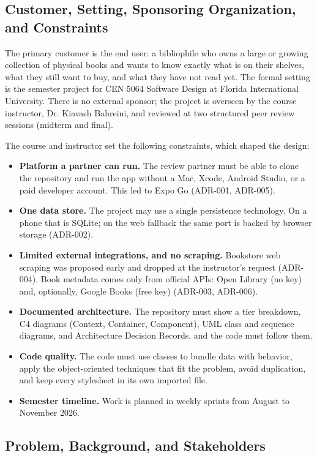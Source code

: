 \documentclass[12pt]{article}
\begin{document}
\subsection{Customer, Setting, Sponsoring Organization, and Constraints}

The primary customer is the end user: a bibliophile who owns a large or growing collection of physical books and wants to know exactly what is on their shelves, what they still want to buy, and what they have not read yet. The formal setting is the semester project for CEN 5064 Software Design at Florida International University. There is no external sponsor; the project is overseen by the course instructor, Dr. Kiavash Bahreini, and reviewed at two structured peer review sessions (midterm and final).

The course and instructor set the following constraints, which shaped the design:
\begin{itemize}
    \item \textbf{Platform a partner can run.} The review partner must be able to clone the repository and run the app without a Mac, Xcode, Android Studio, or a paid developer account. This led to Expo Go (ADR-001, ADR-005).
    \item \textbf{One data store.} The project may use a single persistence technology. On a phone that is SQLite; on the web fallback the same port is backed by browser storage (ADR-002).
    \item \textbf{Limited external integrations, and no scraping.} Bookstore web scraping was proposed early and dropped at the instructor's request (ADR-004). Book metadata comes only from official APIs: Open Library (no key) and, optionally, Google Books (free key) (ADR-003, ADR-006).
    \item \textbf{Documented architecture.} The repository must show a tier breakdown, C4 diagrams (Context, Container, Component), UML class and sequence diagrams, and Architecture Decision Records, and the code must follow them.
    \item \textbf{Code quality.} The code must use classes to bundle data with behavior, apply the object-oriented techniques that fit the problem, avoid duplication, and keep every stylesheet in its own imported file.
    \item \textbf{Semester timeline.} Work is planned in weekly sprints from August to November 2026.
\end{itemize}

\subsection{Problem, Background, and Stakeholders}
\end{document}
